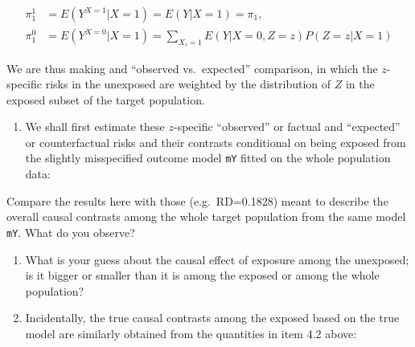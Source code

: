 \documentclass[
]{book}
\newenvironment{Shaded}{\begin{snugshade}}{\end{snugshade}}
\newcommand{\DecValTok}[1]{\textcolor[rgb]{0.00,0.00,0.81}{#1}}
\newcommand{\FunctionTok}[1]{\textcolor[rgb]{0.13,0.29,0.53}{\textbf{#1}}}
\newcommand{\NormalTok}[1]{#1}
\newcommand{\OtherTok}[1]{\textcolor[rgb]{0.56,0.35,0.01}{#1}}
\newcommand{\SpecialCharTok}[1]{\textcolor[rgb]{0.81,0.36,0.00}{\textbf{#1}}}
\providecommand{\tightlist}{%
  \setlength{\itemsep}{0pt}\setlength{\parskip}{0pt}}
\begin{document}
\[\begin{aligned}
 \pi^1_1 & = E(Y^{X=1}|X=1) = E(Y|X=1) = \pi_1, \\
 \pi^0_1 & = E(Y^{X=0}|X=1) = \sum_{X_i=1} E(Y|X=0, Z=z)P(Z=z|X=1)
\end{aligned}\]

We are thus making and ``observed vs.~expected'' comparison, in which the
\(z\)-specific risks in the unexposed are weighted by the distribution of
\(Z\) in the exposed subset of the target population.

\begin{enumerate}
\def\labelenumi{\arabic{enumi}.}
\tightlist
\item
  We shall first estimate these \(z\)-specific ``observed'' or factual and
  ``expected'' or counterfactual risks and their contrasts conditional
  on being exposed from the slightly misspecified outcome model \texttt{mY}
  fitted on the whole population data:
\end{enumerate}

\begin{Shaded}
\end{Shaded}

Compare the results here with those (e.g.~RD=0.1828) meant to describe
the overall causal contrasts among the whole target population from the
same model \texttt{mY}. What do you observe?

\begin{enumerate}
\def\labelenumi{\arabic{enumi}.}
\setcounter{enumi}{1}
\item
  What is your guess about the causal effect of exposure among the
  unexposed; is it bigger or smaller than it is among the exposed or
  among the whole population?
\item
  Incidentally, the true causal contrasts among the exposed based on
  the true model are similarly obtained from the quantities in item
  4.2 above:
\end{enumerate}
\end{document}
